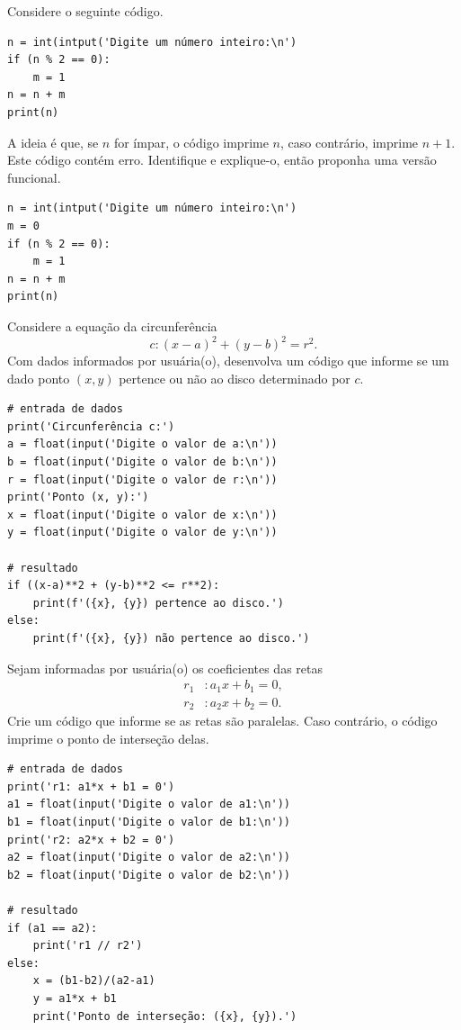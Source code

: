 \begin{exer}
  Considere o seguinte código.
\begin{lstlisting}
n = int(intput('Digite um número inteiro:\n')
if (n % 2 == 0):
    m = 1
n = n + m
print(n)
\end{lstlisting}
  A ideia é que, se $n$ for ímpar, o código imprime $n$, caso contrário, imprime $n+1$. Este código contém erro. Identifique e explique-o, então proponha uma versão funcional.
\end{exer}
\begin{resp}
\begin{lstlisting}
n = int(intput('Digite um número inteiro:\n')
m = 0
if (n % 2 == 0):
    m = 1
n = n + m
print(n)
\end{lstlisting}
\end{resp}

\begin{exer}
  Considere a equação da circunferência
  \begin{equation}
    c: (x-a)^2 + (y-b)^2 = r^2.
  \end{equation}
  Com dados informados por usuária(o), desenvolva um código que informe se um dado ponto $(x, y)$ pertence ou não ao disco determinado por $c$.
\end{exer}
\begin{resp}
\begin{lstlisting}
# entrada de dados
print('Circunferência c:')
a = float(input('Digite o valor de a:\n'))
b = float(input('Digite o valor de b:\n'))
r = float(input('Digite o valor de r:\n'))
print('Ponto (x, y):')
x = float(input('Digite o valor de x:\n'))
y = float(input('Digite o valor de y:\n'))

# resultado
if ((x-a)**2 + (y-b)**2 <= r**2):
    print(f'({x}, {y}) pertence ao disco.')
else:
    print(f'({x}, {y}) não pertence ao disco.')
\end{lstlisting}
\end{resp}

\begin{exer}\label{cap_progest_sec_ramifica:exer:intercep_retas}
  Sejam informadas por usuária(o) os coeficientes das retas
  \begin{align}
    r_1&: a_1x + b_1 = 0,\\
    r_2&: a_2x + b_2 = 0.
  \end{align}
  Crie um código que informe se as retas são paralelas. Caso contrário, o código imprime o ponto de interseção delas.
\end{exer}
\begin{resp}
\begin{lstlisting}
# entrada de dados
print('r1: a1*x + b1 = 0')
a1 = float(input('Digite o valor de a1:\n'))
b1 = float(input('Digite o valor de b1:\n'))
print('r2: a2*x + b2 = 0')
a2 = float(input('Digite o valor de a2:\n'))
b2 = float(input('Digite o valor de b2:\n'))

# resultado
if (a1 == a2):
    print('r1 // r2')
else:
    x = (b1-b2)/(a2-a1)
    y = a1*x + b1
    print('Ponto de interseção: ({x}, {y}).')
\end{lstlisting}
\end{resp}

